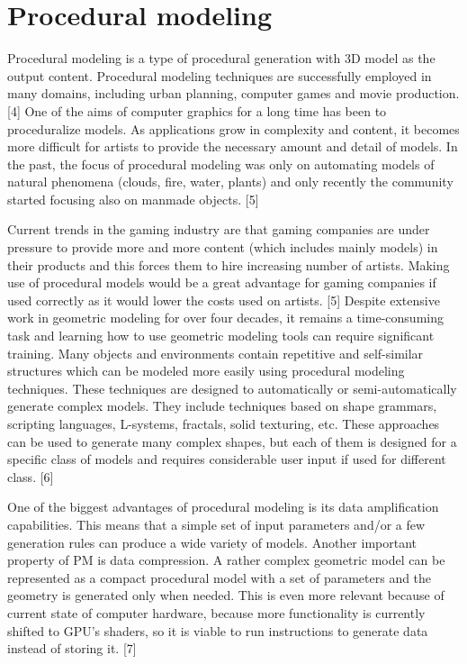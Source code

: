 \documentclass[
  digital, %
  table,   %
  nolof,     %
  nolot,     %
]{fithesis3}
\begin{document}
\section{Procedural modeling}
Procedural modeling is a type of procedural generation with 3D model as the output content. Procedural modeling techniques are successfully employed in many domains, including urban planning, computer games and movie production. [4] 
One of the aims of computer graphics for a long time has been to proceduralize models. As applications grow in complexity and content, it becomes more difficult for artists to provide the necessary amount and detail of models. In the past, the focus of procedural modeling was only on automating models of natural phenomena (clouds, fire, water, plants) and only recently the community started focusing also on manmade objects. [5]\par
Current trends in the gaming industry are that gaming companies are under pressure to provide more and more content (which includes mainly models) in their products and this forces them to hire increasing number of artists. Making use of procedural models would be a great advantage for gaming companies if used correctly as it would lower the costs used on artists. [5]
Despite extensive work in geometric modeling for over four decades, it remains a time-consuming task and learning how to use geometric modeling tools can require significant training. Many objects and environments contain repetitive and self-similar structures which can be modeled more easily using procedural modeling techniques. These techniques are designed to automatically or semi-automatically generate complex models. They include techniques based on shape grammars, scripting languages, L-systems, fractals, solid texturing, etc. These approaches can be used to generate many complex shapes, but each of them is designed for a specific class of models and requires considerable user input if used for different class. [6]\par
One of the biggest advantages of procedural modeling is its data amplification capabilities. This means that a simple set of input parameters and/or a few generation rules can produce a wide variety of models. Another important property of PM is data compression. A rather complex geometric model can be represented as a compact procedural model with a set of parameters and the geometry is generated only when needed. This is even more relevant because of current state of computer hardware, because more functionality is currently shifted to GPU’s shaders, so it is viable to run instructions to generate data instead of storing it. [7] \par
\end{document}
